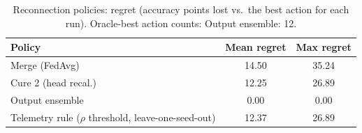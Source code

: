 \begin{table}[t]\centering\small
\caption{Reconnection policies: regret (accuracy points lost vs.\ the best action for each run). Oracle-best action counts: Output ensemble: 12.}
\label{tab:fl_policy}\begin{tabular}{lcc}\toprule Policy & Mean regret & Max regret\\\midrule
Merge (FedAvg) & 14.50 & 35.24\\
Cure 2 (head recal.) & 12.25 & 26.89\\
Output ensemble & 0.00 & 0.00\\
Telemetry rule ($\rho$ threshold, leave-one-seed-out) & 12.37 & 26.89\\
\bottomrule\end{tabular}\end{table}
